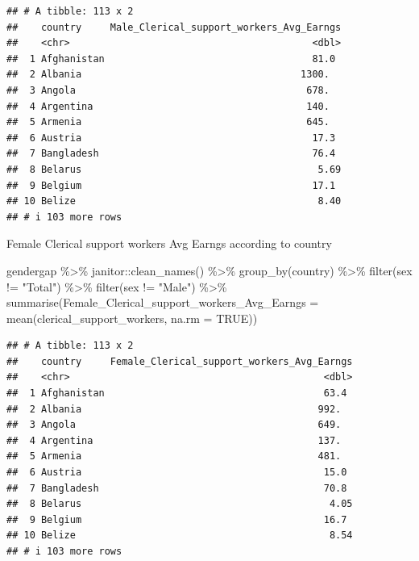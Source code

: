 \documentclass[
]{article}
\newenvironment{Shaded}{\begin{snugshade}}{\end{snugshade}}
\newcommand{\AttributeTok}[1]{\textcolor[rgb]{0.77,0.63,0.00}{#1}}
\newcommand{\ConstantTok}[1]{\textcolor[rgb]{0.00,0.00,0.00}{#1}}
\newcommand{\FunctionTok}[1]{\textcolor[rgb]{0.00,0.00,0.00}{#1}}
\newcommand{\NormalTok}[1]{#1}
\newcommand{\SpecialCharTok}[1]{\textcolor[rgb]{0.00,0.00,0.00}{#1}}
\newcommand{\StringTok}[1]{\textcolor[rgb]{0.31,0.60,0.02}{#1}}
\begin{document}
\begin{verbatim}
## # A tibble: 113 x 2
##    country     Male_Clerical_support_workers_Avg_Earngs
##    <chr>                                          <dbl>
##  1 Afghanistan                                    81.0 
##  2 Albania                                      1300.  
##  3 Angola                                        678.  
##  4 Argentina                                     140.  
##  5 Armenia                                       645.  
##  6 Austria                                        17.3 
##  7 Bangladesh                                     76.4 
##  8 Belarus                                         5.69
##  9 Belgium                                        17.1 
## 10 Belize                                          8.40
## # i 103 more rows
\end{verbatim}

Female Clerical support workers Avg Earngs according to country

\begin{Shaded}
\begin{Highlighting}[]
\NormalTok{gendergap }\SpecialCharTok{\%\textgreater{}\%}
\NormalTok{  janitor}\SpecialCharTok{::}\FunctionTok{clean\_names}\NormalTok{() }\SpecialCharTok{\%\textgreater{}\%}
  \FunctionTok{group\_by}\NormalTok{(country) }\SpecialCharTok{\%\textgreater{}\%} 
   \FunctionTok{filter}\NormalTok{(sex }\SpecialCharTok{!=} \StringTok{"Total"}\NormalTok{) }\SpecialCharTok{\%\textgreater{}\%}
  \FunctionTok{filter}\NormalTok{(sex }\SpecialCharTok{!=} \StringTok{"Male"}\NormalTok{) }\SpecialCharTok{\%\textgreater{}\%}
  \FunctionTok{summarise}\NormalTok{(}\AttributeTok{Female\_Clerical\_support\_workers\_Avg\_Earngs =} \FunctionTok{mean}\NormalTok{(clerical\_support\_workers, }\AttributeTok{na.rm =} \ConstantTok{TRUE}\NormalTok{))}
\end{Highlighting}
\end{Shaded}

\begin{verbatim}
## # A tibble: 113 x 2
##    country     Female_Clerical_support_workers_Avg_Earngs
##    <chr>                                            <dbl>
##  1 Afghanistan                                      63.4 
##  2 Albania                                         992.  
##  3 Angola                                          649.  
##  4 Argentina                                       137.  
##  5 Armenia                                         481.  
##  6 Austria                                          15.0 
##  7 Bangladesh                                       70.8 
##  8 Belarus                                           4.05
##  9 Belgium                                          16.7 
## 10 Belize                                            8.54
## # i 103 more rows
\end{verbatim}
\end{document}
